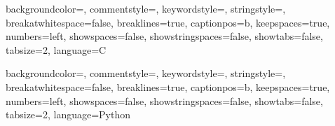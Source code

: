

{
  backgroundcolor=\color{backgroundColour},   
  commentstyle=\color{mGreen},
  keywordstyle=\color{magenta},
  stringstyle=\color{mPurple},
  breakatwhitespace=false,         
  breaklines=true,                 
  captionpos=b,                    
  keepspaces=true,                 
  numbers=left,                    
  showspaces=false,                
  showstringspaces=false,
  showtabs=false,                  
  tabsize=2,
  language=C
}

{
  backgroundcolor=\color{backgroundColour},   
  commentstyle=\color{mGreen},
  keywordstyle=\color{magenta},
  stringstyle=\color{mPurple},
  breakatwhitespace=false,         
  breaklines=true,                 
  captionpos=b,                    
  keepspaces=true,                 
  numbers=left,                    
  showspaces=false,                
  showstringspaces=false,
  showtabs=false,                  
  tabsize=2,
  language=Python
}